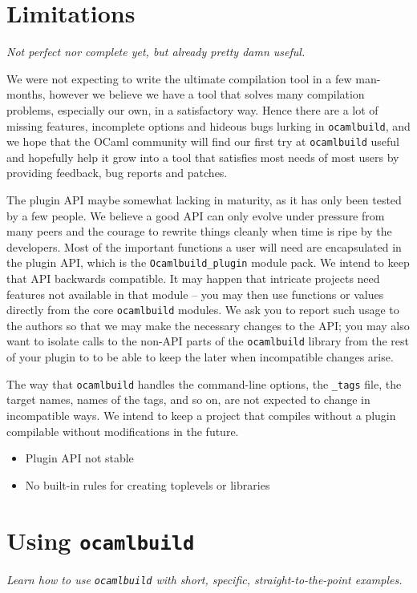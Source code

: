 \documentclass[9pt]{article}
\newcommand{\ocb}{\texttt{ocamlbuild}\xspace}
\begin{document}
\section{Limitations}
{\em Not perfect nor complete yet, but already pretty damn useful.}

We were not expecting to write the ultimate compilation tool in a few man-months, however we believe we have
a tool that solves many compilation problems, especially our own, in a satisfactory way.  Hence there are a
lot of missing features, incomplete options and hideous bugs lurking in \ocb, and we hope that the OCaml community
will find our first try at \ocb useful and hopefully help it grow into a tool that satisfies most needs of most users
by providing feedback, bug reports and patches.

The plugin API maybe somewhat lacking in maturity, as it has only been tested
by a few people.  We believe a good API can only evolve under pressure from
many peers and the courage to rewrite things cleanly when time is ripe by the
developers.  Most of the important functions a user will need are encapsulated
in the plugin API, which is the \texttt{Ocamlbuild\_plugin} module pack.  We
intend to keep that API backwards compatible.  It may happen that intricate
projects need features not available in that module -- you may then use
functions or values directly from the core \ocb modules.  We ask you to report
such usage to the authors so that we may make the necessary changes to the API;
you may also want to isolate calls to the non-API parts of the \ocb library
from the rest of your plugin to to be able to keep the later when incompatible
changes arise.

The way that \ocb handles the command-line options, the \texttt{\_tags} file,
the target names, names of the tags, and so on, are not expected to change in
incompatible ways.  We intend to keep a project that compiles without a plugin
compilable without modifications in the future.

\begin{itemize}
\item Plugin API not stable
\item No built-in rules for creating toplevels or libraries
\end{itemize}
\section{Using \ocb}
{\em Learn how to use \ocb with short, specific, straight-to-the-point examples.}
\end{document}

